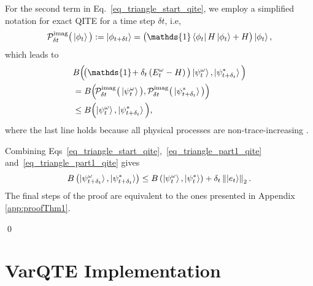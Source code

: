 \documentclass[twocolumn, aps, pra, superscriptaddress]{revtex4-1}
\newcommand{\norm}[1]{\left\lVert#1\right\rVert}
\begin{document}
For the second term in Eq.~\eqref{eq_triangle_start_qite}, we employ a simplified notation for exact QITE for a time step $\delta t$, i.e,
\begin{align}
    \mathcal{P}^{\text{imag}}_{\delta t}\big(\ket{\phi_t}\big) := \ket{\phi_{t+\delta t}} = \big(\mathds{1}\bra{\phi_t}H\ket{\phi_t} + H\big) \ket{\phi_t},
\end{align}
which leads to 
\begin{align}
\label{eq_triangle_part2_qite}
     &B\Big(\!\big(\mathds{1}\!+\delta_t\left(E_t^{\omega}-H\right)\big)\ket{\psi^{\omega}_t}, \ket{\psi^*_{t+\delta_t}}\Big) \\
     &\hspace{0mm}=B\Big(\!\mathcal{P}^{\text{imag}}_{\delta t}\big(\ket{\psi^{\omega}_t}\big), \mathcal{P}^{\text{imag}}_{\delta t}\big(\ket{\psi^*_{t+\delta_t}}\big) \Big) \\
     &\leq B\Big(\!\ket{\psi^{\omega}_t}, \ket{\psi^*_{t+\delta_t}} \Big),
\end{align}
where the last line holds because all physical processes are non-trace-increasing \cite{nielsen10}. 

Combining Eqs~\eqref{eq_triangle_start_qite},~\eqref{eq_triangle_part1_qite} and~\eqref{eq_triangle_part1_qite} gives
\begin{align}
     B\left(\ket{\psi^{\omega}_{t+\delta_t}}, \ket{\psi^*_{t+\delta_t}}\right)
     \leq B\left(\ket{\psi^{\omega}_t}, \ket{\psi_t^*}\right) + \delta_t \norm{\ket{e_t}}_2.
\end{align}
The final steps of the proof are equivalent to the ones presented in Appendix \ref{app:proofThm1}.

\qed


\section{VarQTE Implementation}
\label{app:implementation}
\end{document}
